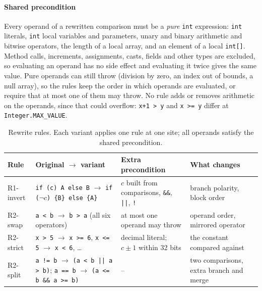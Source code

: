 \paragraph{Shared precondition}
Every operand of a rewritten comparison must be a \emph{pure} \texttt{int}
expression: \texttt{int} literals, \texttt{int} local variables and parameters,
unary and binary arithmetic and bitwise operators, the length of a local array,
and an element of a local \texttt{int[]}. Method calls, increments,
assignments, casts, fields and other types are excluded, so evaluating an
operand has no side effect and evaluating it twice gives the same value. Pure
operands can still throw (division by zero, an index out of bounds, a null
array), so the rules keep the order in which operands are evaluated, or require
that at most one of them may throw. No rule adds or removes arithmetic on the
operands, since that could overflow: \texttt{x+1 > y} and \texttt{x >= y}
differ at \texttt{Integer.MAX\_VALUE}.

\begin{table}[t]
\caption{Rewrite rules. Each variant applies one rule at one site; all
operands satisfy the shared precondition.}
\label{tab:rules}
\small
\begin{tabular}{@{}p{1.6cm}p{4.7cm}p{2.8cm}p{3.0cm}@{}}
\toprule
Rule & Original $\to$ variant & Extra precondition & What changes \\
\midrule
R1-invert & \texttt{if (c) A else B} $\to$ \texttt{if (}$\lnot c$\texttt{) \{B\} else \{A\}}
  & $c$ built from comparisons, \texttt{\&\&}, \texttt{||}, \texttt{!}
  & branch polarity, block order \\
R2-swap & \texttt{a < b} $\to$ \texttt{b > a} (all six operators)
  & at most one operand may throw
  & operand order, mirrored operator \\
R2-strict & \texttt{x > 5} $\to$ \texttt{x >= 6}, \texttt{x <= 5} $\to$ \texttt{x < 6}, \ldots
  & decimal literal; $c\pm1$ within 32 bits
  & the constant compared against \\
R2-split & \texttt{a != b} $\to$ \texttt{(a < b || a > b)};\newline
  \texttt{a == b} $\to$ \texttt{(a <= b \&\& a >= b)}
  & --
  & two comparisons, extra branch and merge \\
\bottomrule
\end{tabular}
\end{table}

